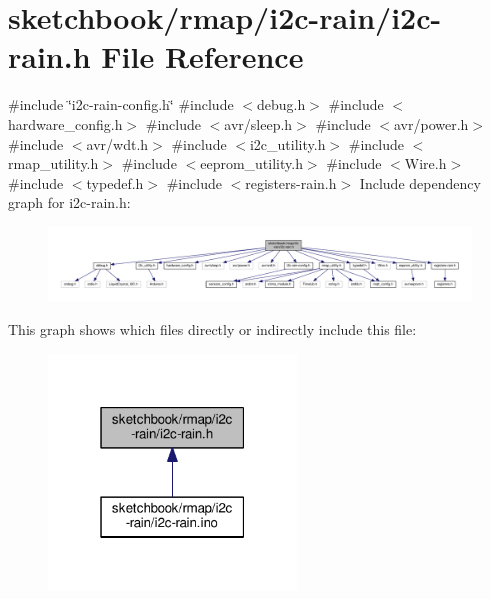 \hypertarget{i2c-rain_8h}{}\section{sketchbook/rmap/i2c-\/rain/i2c-\/rain.h File Reference}
\label{i2c-rain_8h}
{\ttfamily \#include \char`\"{}i2c-\/rain-\/config.\+h\char`\"{}}\newline
{\ttfamily \#include $<$debug.\+h$>$}\newline
{\ttfamily \#include $<$hardware\+\_\+config.\+h$>$}\newline
{\ttfamily \#include $<$avr/sleep.\+h$>$}\newline
{\ttfamily \#include $<$avr/power.\+h$>$}\newline
{\ttfamily \#include $<$avr/wdt.\+h$>$}\newline
{\ttfamily \#include $<$i2c\+\_\+utility.\+h$>$}\newline
{\ttfamily \#include $<$rmap\+\_\+utility.\+h$>$}\newline
{\ttfamily \#include $<$eeprom\+\_\+utility.\+h$>$}\newline
{\ttfamily \#include $<$Wire.\+h$>$}\newline
{\ttfamily \#include $<$typedef.\+h$>$}\newline
{\ttfamily \#include $<$registers-\/rain.\+h$>$}\newline
Include dependency graph for i2c-\/rain.h\+:\nopagebreak
\begin{figure}[H]
\begin{center}
\leavevmode
\includegraphics[width=350pt]{i2c-rain_8h__incl}
\end{center}
\end{figure}
This graph shows which files directly or indirectly include this file\+:\nopagebreak
\begin{figure}[H]
\begin{center}
\leavevmode
\includegraphics[width=187pt]{i2c-rain_8h__dep__incl}
\end{center}
\end{figure}
